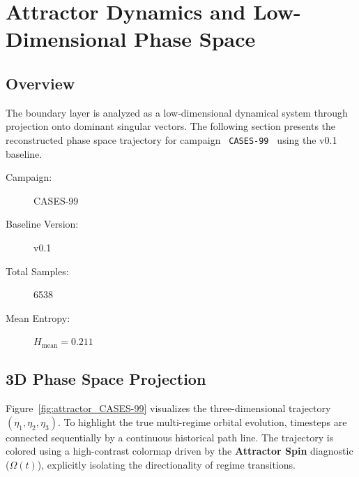 \documentclass[11pt,a4paper]{article}
\begin{document}
\newpage



\section{Attractor Dynamics and Low-Dimensional Phase Space}

\subsection{Overview}

The boundary layer is analyzed as a low-dimensional dynamical system through projection onto dominant singular vectors. The following section presents the reconstructed phase space trajectory for campaign \texttt{ CASES-99 } using the v0.1 baseline.

\begin{description}
    \item[Campaign:] CASES-99
    \item[Baseline Version:] v0.1
    \item[Total Samples:] 6538
    \item[Mean Entropy:] $H_{\text{mean}} = 0.211$
\end{description}

\subsection{3D Phase Space Projection}

Figure~\ref{fig:attractor_CASES-99} visualizes the three-dimensional trajectory $(\eta_1, \eta_2, \eta_3)$. To highlight the true multi-regime orbital evolution, timesteps are connected sequentially by a continuous historical path line. The trajectory is colored using a high-contrast colormap driven by the \textbf{Attractor Spin} diagnostic ($\Omega(t)$), explicitly isolating the directionality of regime transitions.
\end{document}
